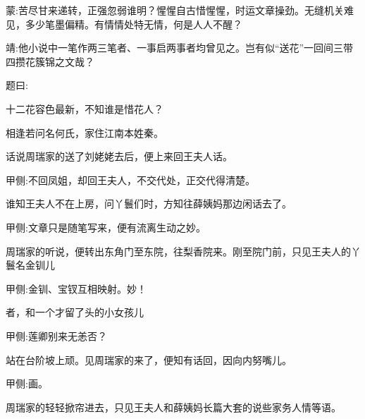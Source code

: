 

\begin{parag}
    \begin{note}蒙:苦尽甘来递转，正强忽弱谁明？惺惺自古惜惺惺，时运文章操劲。无缝机关难见，多少笔墨偏精。有情情处特无情，何是人人不醒？\end{note}
\end{parag}


\begin{parag}
    \begin{note}靖:他小说中一笔作两三笔者、一事启两事者均曾见之。岂有似“送花”一回间三带四攒花簇锦之文哉？\end{note}
\end{parag}


\begin{parag}
    题曰:
\end{parag}


\begin{poem}
    \begin{pl}十二花容色最新，不知谁是惜花人？\end{pl}

    \begin{pl}相逢若问名何氏，家住江南本姓秦。\end{pl}
\end{poem}


\begin{parag}
    话说周瑞家的送了刘姥姥去后，便上来回王夫人话。\begin{note}甲侧:不回凤姐，却回王夫人，不交代处，正交代得清楚。\end{note}谁知王夫人不在上房，问丫鬟们时，方知往薛姨妈那边闲话去了。\begin{note}甲侧:文章只是随笔写来，便有流离生动之妙。\end{note}周瑞家的听说，便转出东角门至东院，往梨香院来。刚至院门前，只见王夫人的丫鬟名金钏儿\begin{note}甲侧:金钏、宝钗互相映射。妙！\end{note}者，和一个才留了头的小女孩儿\begin{note}甲侧:莲卿别来无恙否？\end{note}站在台阶坡上顽。见周瑞家的来了，便知有话回，因向内努嘴儿。\begin{note}甲侧:画。\end{note}周瑞家的轻轻掀帘进去，只见王夫人和薛姨妈长篇大套的说些家务人情等语。
\end{parag}


